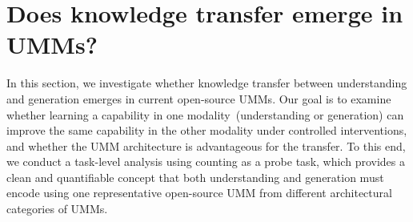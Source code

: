 \section{Does knowledge transfer emerge in UMMs?}

\label{sec:umms}




In this section, we investigate whether knowledge transfer between understanding and generation emerges in current open-source UMMs. Our goal is to examine whether learning a capability in one modality~(understanding or generation) can improve the same capability in the other modality under controlled interventions, and whether the UMM architecture is advantageous for the transfer. To this end, we conduct a task-level analysis using counting as a probe task, which provides a clean and quantifiable concept that both understanding and generation must encode using one representative open-source UMM from different architectural categories of UMMs.


